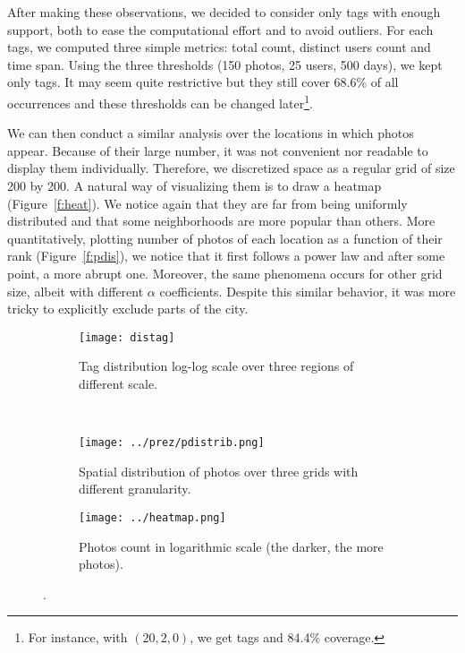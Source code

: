 After making these observations, we decided to consider only tags with enough
support, both to ease the computational effort and to avoid outliers. For each
tags, we computed three simple metrics: total count, distinct users count and
time span. Using the three thresholds (150 photos, 25 users, 500 days), we
kept only  tags. It may seem quite restrictive but they still
cover 68.6\% of all occurrences and these thresholds can be changed
later\footnote{For instance, with $(20, 2, 0)$, we get  tags
and 84.4\% coverage.}.

We can then conduct a similar analysis over the locations in which photos
appear. Because of their large number, it was not convenient nor readable to
display them individually. Therefore, we discretized space as a regular grid
of size 200 by 200. A natural way of visualizing them is to draw a heatmap
(Figure~\vref{f:heat}).  We notice again that they are far from being
uniformly distributed and that some neighborhoods are more popular than
others. More quantitatively, plotting number of photos of each location as a
function of their rank (Figure~\vref{f:pdis}), we notice that it first follows
a power law and after some point, a more abrupt one. Moreover, the same
phenomena occurs for other grid size, albeit with different $\alpha$
coefficients. Despite this similar behavior, it was more tricky to explicitly
exclude parts of the city.

\clearpage
{}
\thispagestyle{empty}
\begin{figure}[p]
        \centering
		\begin{subfigure}[b]{0.5\textwidth}
			\texttt{[image: distag]}
			\caption{Tag distribution log-log scale over three regions of
			different scale.\label{f:tags}}
		\end{subfigure}~
        \begin{subfigure}[b]{0.5\textwidth}
			\texttt{[image: ../prez/pdistrib.png]}
			\caption{Spatial distribution of photos over three grids with
			different granularity.\label{f:pdis}}
        \end{subfigure}

		\begin{subfigure}[b]{\textwidth}
			\centering
			\texttt{[image: ../heatmap.png]}
			\caption{Photos count in logarithmic scale (the darker, the more
			photos).\label{f:heat}}
		\end{subfigure}
		\caption{.\label{f:distrib}}
\end{figure}
\restoregeometry

